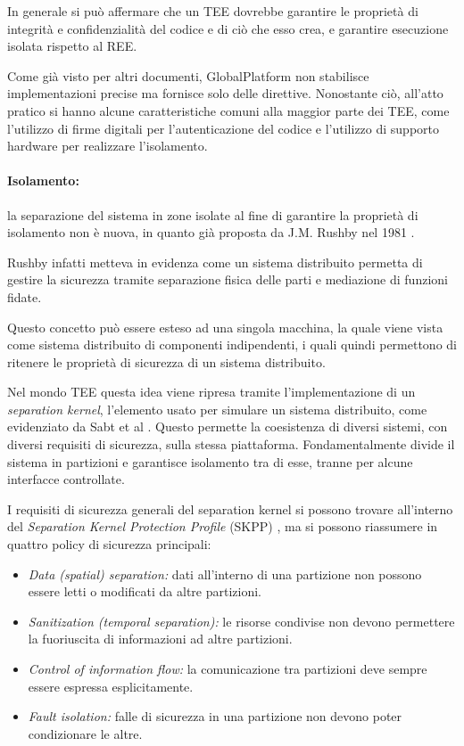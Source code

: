 \documentclass[12pt,italian]{report}
\begin{document}
	\bigbreak
	
	In generale si può affermare che un TEE dovrebbe garantire le proprietà di integrità e confidenzialità del codice e di ciò che esso crea, e garantire esecuzione isolata rispetto al REE.
	
	Come già visto per altri documenti, GlobalPlatform non stabilisce implementazioni precise ma fornisce solo delle direttive. Nonostante ciò, all'atto pratico si hanno alcune caratteristiche comuni alla maggior parte dei TEE, come l'utilizzo di firme digitali per l'autenticazione del codice e l'utilizzo di supporto hardware per realizzare l'isolamento.
	
	\bigbreak
	
	\paragraph{Isolamento:} la separazione del sistema in zone isolate al fine di garantire la proprietà di isolamento non è nuova, in quanto già proposta da J.M. Rushby nel 1981 \cite{rushby1981separationkernel}. 
	
	Rushby infatti metteva in evidenza come un sistema distribuito permetta di gestire la sicurezza tramite separazione fisica delle parti e mediazione di funzioni fidate.
	
	Questo concetto può essere esteso ad una singola macchina, la quale viene vista come sistema distribuito di componenti indipendenti, i quali quindi permettono di ritenere le proprietà di sicurezza di un sistema distribuito.
	
	Nel mondo TEE questa idea viene ripresa tramite l'implementazione di un \textit{separation kernel}, l'elemento usato per simulare un sistema distribuito, come evidenziato da Sabt et al \cite{sabt2015tee}. Questo permette la coesistenza di diversi sistemi, con diversi requisiti di sicurezza, sulla stessa piattaforma. Fondamentalmente divide il sistema in partizioni e garantisce isolamento tra di esse, tranne per alcune interfacce controllate.
	
	I requisiti di sicurezza generali del separation kernel si possono trovare all'interno del \textit{Separation Kernel Protection Profile} (SKPP) \cite{spkk2007}, ma si possono riassumere in quattro policy di sicurezza principali: 
	\begin{itemize}
		\item \textit{Data (spatial) separation:} dati all'interno di una partizione non possono essere letti o modificati da altre partizioni.
		\item \textit{Sanitization (temporal separation):} le risorse condivise non devono permettere la fuoriuscita di informazioni ad altre partizioni.
		\item \textit{Control of information flow:} la comunicazione tra partizioni deve sempre essere espressa esplicitamente.
		\item \textit{Fault isolation:} falle di sicurezza in una partizione non devono poter condizionare le altre.
	\end{itemize}
	
\end{document}
